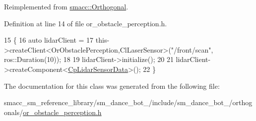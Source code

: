Reimplemented from \hyperlink{classsmacc_1_1Orthogonal_a7a3da420b1554e20aea3ed01067df05c}{smacc\+::\+Orthogonal}.



Definition at line 14 of file or\+\_\+obstacle\+\_\+perception.\+h.


\begin{DoxyCode}
15   \{
16     \textcolor{keyword}{auto} lidarClient =
17         this->createClient<OrObstaclePerception,ClLaserSensor>(\textcolor{stringliteral}{"/front/scan"}, ros::Duration(10));
18 
19     lidarClient->initialize();
20 
21     lidarClient->createComponent<\hyperlink{classsm__dance__bot__2_1_1cl__lidar_1_1CpLidarSensorData}{CpLidarSensorData}>();
22   \}
\end{DoxyCode}


The documentation for this class was generated from the following file\+:\begin{DoxyCompactItemize}
\item 
smacc\+\_\+sm\+\_\+reference\+\_\+library/sm\+\_\+dance\+\_\+bot\+\_/include/sm\+\_\+dance\+\_\+bot\+\_/orthogonals/\hyperlink{2_2include_2sm__dance__bot__2_2orthogonals_2or__obstacle__perception_8h}{or\+\_\+obstacle\+\_\+perception.\+h}\end{DoxyCompactItemize}
